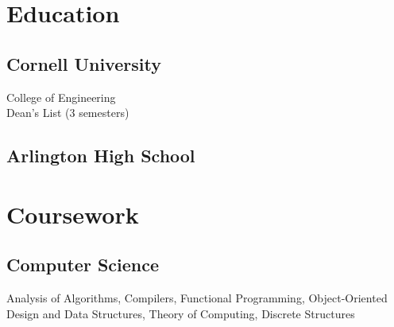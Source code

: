 \documentclass[]{deedy-resume-openfont}
\let\sectionold\section
\renewcommand{\section}[1]{
	\sectionold{\textcolor{sectiontitlecolor}{#1}}
}
\begin{document}
%
%

%
%



%
%

\begin{minipage}[t]{0.33\textwidth} 


\section{Education} 

\subsection{Cornell University}

College of Engineering \\
Dean's List (3 semesters) \\
\sectionsep

\subsection{Arlington High School}
\sectionsep



\section{Coursework}
\subsection{Computer Science}
Analysis of Algorithms, Compilers, Functional Programming, Object-Oriented Design and Data Structures, Theory of Computing, Discrete Structures
\sectionsep


\end{minipage}
\end{document}
